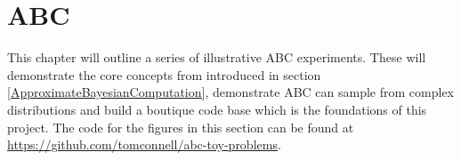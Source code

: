 \chapter{ABC}

This chapter will outline a series of illustrative ABC experiments. These will demonstrate the core concepts from introduced in section \ref{ApproximateBayesianComputation}, demonstrate ABC can sample from complex distributions and build a boutique code base which is the foundations of this project. The code for the figures in this section can be found at \url{https://github.com/tomconnell/abc-toy-problems}.




